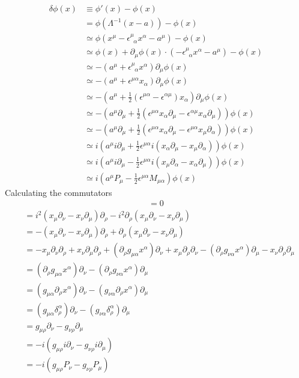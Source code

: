 \documentclass[10pt,a4paper]{book}
\theoremstyle{definition}
\begin{document}
\begin{align}
\delta\phi(x)
&\equiv\phi'(x)-\phi(x)\\
&=\phi(\Lambda^{-1}(x-a))-\phi(x)\\
&\simeq\phi(x^\mu-\epsilon^\mu_{\;\;\alpha}x^\alpha-a^\mu)-\phi(x)\\
&\simeq\phi(x)+\partial_\mu\phi(x)\cdot(-\epsilon^\mu_{\;\;\alpha}x^\alpha-a^\mu)-\phi(x)\\
&\simeq-(a^\mu+\epsilon^\mu_{\;\;\alpha}x^\alpha)\partial_\mu\phi(x)\\
&\simeq-(a^\mu+\epsilon^{\mu\alpha}x_\alpha)\partial_\mu\phi(x)\\
&\simeq-\left(a^\mu+\frac{1}{2}\left(\epsilon^{\mu\alpha}-\epsilon^{\alpha\mu}\right)x_\alpha\right)\partial_\mu\phi(x)\\
&\simeq-\left(a^\mu\partial_\mu+\frac{1}{2}\left(\epsilon^{\mu\alpha}x_\alpha\partial_\mu-\epsilon^{\alpha\mu}x_\alpha\partial_\mu\right)\right)\phi(x)\\
&\simeq-\left(a^\mu\partial_\mu+\frac{1}{2}\left(\epsilon^{\mu\alpha}x_\alpha\partial_\mu-\epsilon^{\mu\alpha}x_\mu\partial_\alpha\right)\right)\phi(x)\\
&\simeq i\left(a^\mu i\partial_\mu+\frac{1}{2}\epsilon^{\mu\alpha}i\left(x_\alpha\partial_\mu-x_\mu\partial_\alpha\right)\right)\phi(x)\\
&\simeq i\left(a^\mu i\partial_\mu-\frac{1}{2}\epsilon^{\mu\alpha}i\left(x_\mu\partial_\alpha-x_\alpha\partial_\mu\right)\right)\phi(x)\\
&\simeq i\left(a^\mu P_\mu-\frac{1}{2}\epsilon^{\mu\alpha}M_{\mu\alpha}\right)\phi(x)
\end{align}
Calculating the commutators
\begin{align}
[P_\mu,P_\nu]=0
\end{align}
\begin{align}
[M_{\mu\nu},P_\rho]
&=i^2(x_\mu\partial_\nu-x_\nu\partial_\mu)\partial_\rho-i^2\partial_\rho(x_\mu\partial_\nu-x_\nu\partial_\mu)\\
&=-(x_\mu\partial_\nu-x_\nu\partial_\mu)\partial_\rho+\partial_\rho(x_\mu\partial_\nu-x_\nu\partial_\mu)\\
&=-x_\mu\partial_\nu\partial_\rho+x_\nu\partial_\mu\partial_\rho+ (\partial_\rho g_{\mu\alpha}x^\alpha)\partial_\nu+x_\mu\partial_\rho\partial_\nu
-(\partial_\rho g_{\nu\alpha}x^\alpha)\partial_\mu-x_\nu\partial_\rho\partial_\mu\\
&=(\partial_\rho g_{\mu\alpha}x^\alpha)\partial_\nu
-(\partial_\rho g_{\nu\alpha}x^\alpha)\partial_\mu\\
&=(g_{\mu\alpha}\partial_\rho x^\alpha)\partial_\nu
-(g_{\nu\alpha}\partial_\rho x^\alpha)\partial_\mu\\
&=(g_{\mu\alpha}\delta^\alpha_\rho)\partial_\nu
-(g_{\nu\alpha}\delta^\alpha_\rho)\partial_\mu\\
&=g_{\mu\rho}\partial_\nu
-g_{\nu\rho}\partial_\mu\\
&=-i(g_{\mu\rho}i\partial_\nu
-g_{\nu\rho}i\partial_\mu)\\
&=-i(g_{\mu\rho}P_\nu
-g_{\nu\rho}P_\mu)
\end{align}
\end{document}
